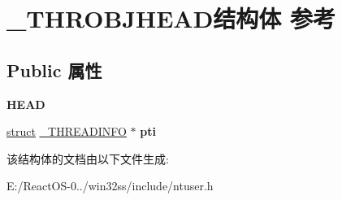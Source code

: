 \hypertarget{struct___t_h_r_o_b_j_h_e_a_d}{}\section{\+\_\+\+T\+H\+R\+O\+B\+J\+H\+E\+A\+D结构体 参考}
\label{struct___t_h_r_o_b_j_h_e_a_d}
\subsection*{Public 属性}
\begin{DoxyCompactItemize}
\item 
\mbox{\label{struct___t_h_r_o_b_j_h_e_a_d_abe55ffedd3bf46cf1d97795cfe9e50fd}} 
{\bfseries H\+E\+AD}
\item 
\mbox{\label{struct___t_h_r_o_b_j_h_e_a_d_adcfb0282bb6bad32a630da4c1448e43b}} 
\hyperlink{interfacestruct}{struct} \hyperlink{struct___t_h_r_e_a_d_i_n_f_o}{\+\_\+\+T\+H\+R\+E\+A\+D\+I\+N\+FO} $\ast$ {\bfseries pti}
\end{DoxyCompactItemize}


该结构体的文档由以下文件生成\+:\begin{DoxyCompactItemize}
\item 
E\+:/\+React\+O\+S-\/0../win32ss/include/ntuser.\+h\end{DoxyCompactItemize}
